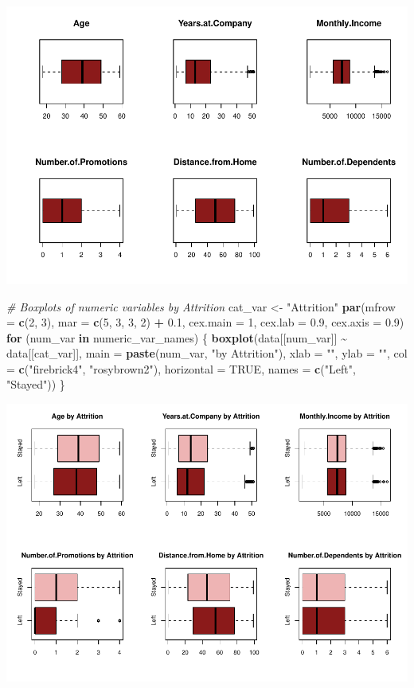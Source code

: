 \documentclass[
  10pt,
  paper=a4,
  ,captions=tableheading
]{scrartcl}
\newenvironment{Shaded}{\begin{snugshade}}{\end{snugshade}}
\newcommand{\AttributeTok}[1]{\textcolor[rgb]{0.13,0.29,0.53}{#1}}
\newcommand{\CommentTok}[1]{\textcolor[rgb]{0.56,0.35,0.01}{\textit{#1}}}
\newcommand{\ConstantTok}[1]{\textcolor[rgb]{0.56,0.35,0.01}{#1}}
\newcommand{\ControlFlowTok}[1]{\textcolor[rgb]{0.13,0.29,0.53}{\textbf{#1}}}
\newcommand{\DecValTok}[1]{\textcolor[rgb]{0.00,0.00,0.81}{#1}}
\newcommand{\FloatTok}[1]{\textcolor[rgb]{0.00,0.00,0.81}{#1}}
\newcommand{\FunctionTok}[1]{\textcolor[rgb]{0.13,0.29,0.53}{\textbf{#1}}}
\newcommand{\NormalTok}[1]{#1}
\newcommand{\OtherTok}[1]{\textcolor[rgb]{0.56,0.35,0.01}{#1}}
\newcommand{\SpecialCharTok}[1]{\textcolor[rgb]{0.81,0.36,0.00}{\textbf{#1}}}
\newcommand{\StringTok}[1]{\textcolor[rgb]{0.31,0.60,0.02}{#1}}
\begin{document}
\includegraphics[width=0.75\linewidth]{figs/data_outlier-1}

\begin{Shaded}
\begin{Highlighting}[]
\CommentTok{\# Boxplots of numeric variables by Attrition}
\NormalTok{cat\_var }\OtherTok{\textless{}{-}} \StringTok{"Attrition"}
\FunctionTok{par}\NormalTok{(}\AttributeTok{mfrow =} \FunctionTok{c}\NormalTok{(}\DecValTok{2}\NormalTok{, }\DecValTok{3}\NormalTok{), }\AttributeTok{mar =} \FunctionTok{c}\NormalTok{(}\DecValTok{5}\NormalTok{, }\DecValTok{3}\NormalTok{, }\DecValTok{3}\NormalTok{, }\DecValTok{2}\NormalTok{) }\SpecialCharTok{+} \FloatTok{0.1}\NormalTok{, }\AttributeTok{cex.main =} \DecValTok{1}\NormalTok{, }\AttributeTok{cex.lab =} \FloatTok{0.9}\NormalTok{,}
    \AttributeTok{cex.axis =} \FloatTok{0.9}\NormalTok{)}
\ControlFlowTok{for}\NormalTok{ (num\_var }\ControlFlowTok{in}\NormalTok{ numeric\_var\_names) \{}
    \FunctionTok{boxplot}\NormalTok{(data[[num\_var]] }\SpecialCharTok{\textasciitilde{}}\NormalTok{ data[[cat\_var]], }\AttributeTok{main =} \FunctionTok{paste}\NormalTok{(num\_var, }\StringTok{"by Attrition"}\NormalTok{),}
        \AttributeTok{xlab =} \StringTok{""}\NormalTok{, }\AttributeTok{ylab =} \StringTok{""}\NormalTok{, }\AttributeTok{col =} \FunctionTok{c}\NormalTok{(}\StringTok{"firebrick4"}\NormalTok{, }\StringTok{"rosybrown2"}\NormalTok{), }\AttributeTok{horizontal =} \ConstantTok{TRUE}\NormalTok{,}
        \AttributeTok{names =} \FunctionTok{c}\NormalTok{(}\StringTok{"Left"}\NormalTok{, }\StringTok{"Stayed"}\NormalTok{))}
\NormalTok{\}}
\end{Highlighting}
\end{Shaded}

\includegraphics[width=0.75\linewidth]{figs/data_outlier-2}
\end{document}
